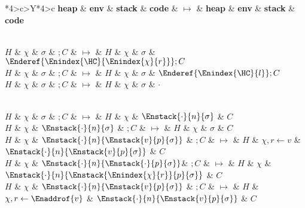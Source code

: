 \begin{xltabular}{\textwidth}{*{4}{>{\scriptsize}c}>{\tiny\bfseries}Y*{4}{>{\scriptsize}c}}
	\toprule
	{\footnotesize \bfseries heap} & {\footnotesize \bfseries env} & {\footnotesize \bfseries stack} & {\footnotesize \bfseries code} & $\bm{\mapsto}$ & {\footnotesize \bfseries heap} & {\footnotesize \bfseries env} & {\footnotesize \bfseries stack} & {\footnotesize \bfseries code} \\
	\midrule \endhead

	 \\

	$H$ & $\chi$ & $\sigma$ & $; C$ & $\bm{\mapsto}$ & $H$ & $\chi$ & $\sigma$ & $\Enderef{\Enindex{\HC}{\Enindex{\chi}{r}}}; C$ \\
	$H$ & $\chi$ & $\sigma$ & $; C$ & $\bm{\mapsto}$ & $H$ & $\chi$ & $\sigma$ & $\Enderef{\Enindex{\HC}{l}}; C$ \\

	$H$ & $\chi$ & $\sigma$ & \Inhalt$; C$ & $\bm{\mapsto}$ & $H$ & $\chi$ & $\sigma$ & $\cdot$ \\

	\midrule

	 \\

	$H$ & $\chi$ & $\sigma$ & $; C$ & $\bm{\mapsto}$ & $H$ & $\chi$ & $\Enstack{\cdot}{n}{\sigma}$ & $C$ \\
	$H$ & $\chi$ & $\Enstack{\cdot}{n}{\sigma}$ & $; C$ & $\bm{\mapsto}$ & $H$ & $\chi$ & $\sigma$ & $C$ \\
	$H$ & $\chi$ & $\Enstack{\cdot}{n}{\Enstack{v}{p}{\sigma}}$ & $; C$ & $\bm{\mapsto}$ & $H$ & $\chi, {r}\gets{v}$ & $\Enstack{\cdot}{n}{\Enstack{v}{p}{\sigma}}$ & $C$ \\
	$H$ & $\chi$ & $\Enstack{\cdot}{n}{\Enstack{\cdot}{p}{\sigma}}$& $; C$ & $\bm{\mapsto}$ & $H$ & $\chi$ & $\Enstack{\cdot}{n}{\Enstack{\Enindex{\chi}{r}}{p}{\sigma}}$ & $C$ \\
	$H$ & $\chi$ & $\Enstack{\cdot}{n}{\Enstack{v}{p}{\sigma}}$ & $; C$ & $\bm{\mapsto}$ & $H$ & $\chi, {r}\gets{\Enaddrof{v}}$ & $\Enstack{\cdot}{n}{\Enstack{v}{p}{\sigma}}$ & $C$ \\

	\midrule

	 \\


\end{xltabular}
